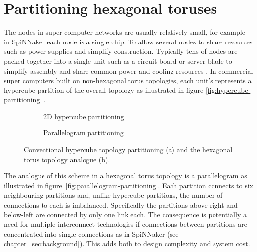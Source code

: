 \chapter{Partitioning hexagonal toruses}
	
	\label{sec:partitioning}
	
	The nodes in super computer networks are usually relatively small, for
	example in SpiNNaker each node is a single chip. To allow several nodes to
	share resources such as power supplies and simplify construction. Typically
	tens of nodes are packed together into a single unit such as a circuit board
	or server blade to simplify assembly and share common power and cooling
	resources \cite{gilge14,ajima12}. In commercial super computers built on
	non-hexagonal torus topologies, each unit's represents a hypercube partition
	of the overall topology as illustrated in figure
	\ref{fig:hypercube-partitioning} \cite{chen11,ajima12}.
	
	\begin{figure}
		\center
		\begin{subfigure}[b]{0.45\textwidth}
			\center
			\caption{2D hypercube partitioning}
			\label{fig:apdx-hypercube-partitioning}
		\end{subfigure}
		\begin{subfigure}[b]{0.45\textwidth}
			\center
			\caption{Parallelogram partitioning}
			\label{fig:apdx-parallelogram-partitioning}
		\end{subfigure}
		
		\caption[Torus partitioning.]%
		{Conventional hypercube topology partitioning (a) and the
		hexagonal torus topology analogue (b).}
		\label{fig:apdx-partitioning-options}
	\end{figure}
	
	
	The analogue of this scheme in a hexagonal torus topology is a parallelogram
	as illustrated in figure~\ref{fig:parallelogram-partitioning}.  Each
	partition connects to six neighbouring partitions and, unlike hypercube
	partitions, the number of connections to each is imbalanced.  Specifically
	the partitions above-right and below-left are connected by only one link
	each. The consequence is potentially a need for multiple interconnect
	technologies if connections between partitions are concentrated into single
	connections as in SpiNNaker (see chapter~\ref{sec:background}). This adds
	both to design complexity and system cost.
	
